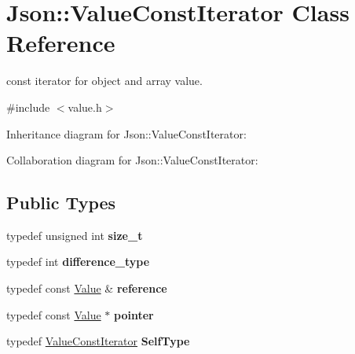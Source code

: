 \hypertarget{class_json_1_1_value_const_iterator}{\section{Json\+:\+:Value\+Const\+Iterator Class Reference}
\label{class_json_1_1_value_const_iterator}
}


const iterator for object and array value.  




{\ttfamily \#include $<$value.\+h$>$}



Inheritance diagram for Json\+:\+:Value\+Const\+Iterator\+:


Collaboration diagram for Json\+:\+:Value\+Const\+Iterator\+:
\subsection*{Public Types}
\begin{DoxyCompactItemize}
\item 
\hypertarget{class_json_1_1_value_const_iterator_a8685219d214dbd2b763357ae94fb0f27}{typedef unsigned int {\bfseries size\+\_\+t}}\label{class_json_1_1_value_const_iterator_a8685219d214dbd2b763357ae94fb0f27}

\item 
\hypertarget{class_json_1_1_value_const_iterator_a32b36aa9d76e2b48ca74fb6e1979a95a}{typedef int {\bfseries difference\+\_\+type}}\label{class_json_1_1_value_const_iterator_a32b36aa9d76e2b48ca74fb6e1979a95a}

\item 
\hypertarget{class_json_1_1_value_const_iterator_aa9b05c6a37cd352ea1ee6e13b816f709}{typedef const \hyperlink{class_json_1_1_value}{Value} \& {\bfseries reference}}\label{class_json_1_1_value_const_iterator_aa9b05c6a37cd352ea1ee6e13b816f709}

\item 
\hypertarget{class_json_1_1_value_const_iterator_a400136bd8bc09e9fddec0785fa2cff14}{typedef const \hyperlink{class_json_1_1_value}{Value} $\ast$ {\bfseries pointer}}\label{class_json_1_1_value_const_iterator_a400136bd8bc09e9fddec0785fa2cff14}

\item 
\hypertarget{class_json_1_1_value_const_iterator_a0c2e33e7eb5a80dd8709fb28ece83933}{typedef \hyperlink{class_json_1_1_value_const_iterator}{Value\+Const\+Iterator} {\bfseries Self\+Type}}\label{class_json_1_1_value_const_iterator_a0c2e33e7eb5a80dd8709fb28ece83933}

\end{DoxyCompactItemize}
